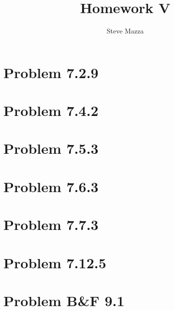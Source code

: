 \documentclass[letterpaper,10pt]{article}
\title{Homework V}
\author{Steve Mazza}
\begin{document}
\maketitle

\section*{Problem 7.2.9}

\section*{Problem 7.4.2}

\section*{Problem 7.5.3}

\section*{Problem 7.6.3}

\section*{Problem 7.7.3}

\section*{Problem 7.12.5}

\section*{Problem B\&F 9.1}
\end{document}
